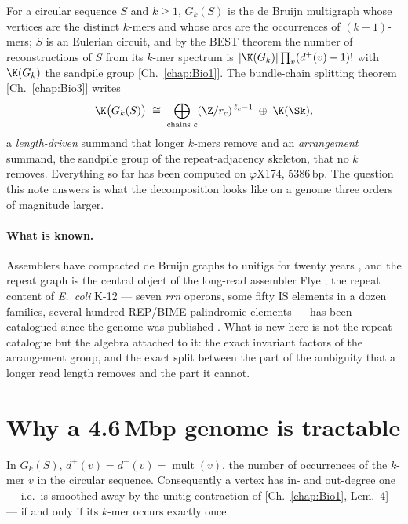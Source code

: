 For a circular sequence $S$ and $k\ge1$, $G_k(S)$ is the de Bruijn multigraph whose
vertices are the distinct $k$-mers and whose arcs are the occurrences of $(k{+}1)$-mers;
$S$ is an Eulerian circuit, and by the BEST theorem the number of reconstructions of $S$
from its $k$-mer spectrum is $|\K(G_k)|\prod_v(d^{+}(v)-1)!$ with $\K(G_k)$ the sandpile
group [Ch.~\ref{chap:Bio1}]. The bundle-chain splitting theorem [Ch.~\ref{chap:Bio3}] writes
\[
\K\bigl(G_k(S)\bigr)\;\cong\;\bigoplus_{\text{chains }c}(\Z/r_c)^{\,\ell_c-1}
\;\oplus\;\K(\Sk),
\]
a \emph{length-driven} summand that longer $k$-mers remove and an \emph{arrangement}
summand, the sandpile group of the repeat-adjacency skeleton, that no $k$ removes.
Everything so far has been computed on $\varphi$X174, $5386$\,bp. The question this note
answers is what the decomposition looks like on a genome three orders of magnitude
larger.

\paragraph{What is known.} Assemblers have compacted de Bruijn graphs to unitigs for
twenty years \cite{PTW,KM,BCALM}, and the repeat graph is the central object of the
long-read assembler Flye \cite{PTT,Flye}; the repeat content of \emph{E.\ coli} K-12 ---
seven \emph{rrn} operons, some fifty IS elements in a dozen families, several hundred
REP/BIME palindromic elements --- has been catalogued since the genome was published
\cite{Blattner}. What is new here is not the repeat catalogue but the algebra attached to
it: the exact invariant factors of the arrangement group, and the exact split between the
part of the ambiguity that a longer read length removes and the part it cannot.

\section{Why a 4.6\,Mbp genome is tractable}\label{Bio5:sec:scaling}

\begin{lemma}\label{Bio5:lem:branch}
In $G_k(S)$, $d^{+}(v)=d^{-}(v)=\operatorname{mult}(v)$, the number of occurrences of the
$k$-mer $v$ in the circular sequence. Consequently a vertex has in- and out-degree one
--- i.e.\ is smoothed away by the unitig contraction of [Ch.~\ref{chap:Bio1}, Lem.~4] --- if and
only if its $k$-mer occurs exactly once.
\end{lemma}

